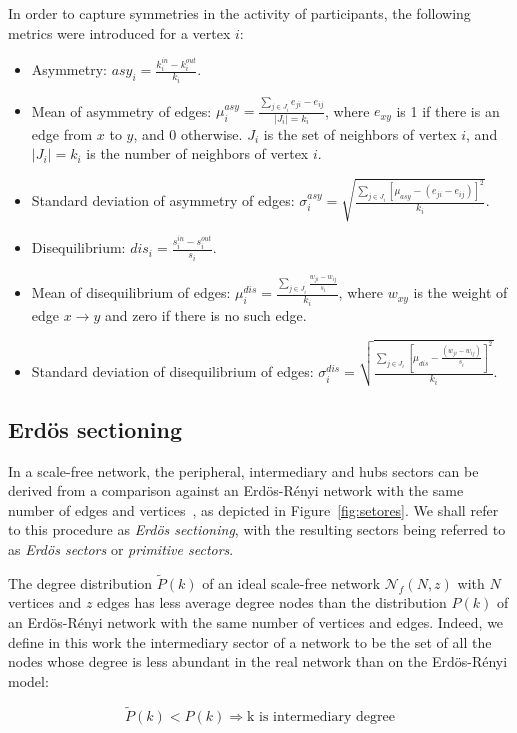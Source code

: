 \documentclass[%
	aip,
	jmp,%
	amsmath,amssymb,
	reprint,%
]{revtex4-1}
\begin{document}
In order to capture symmetries in the activity of participants, the following metrics were introduced for a vertex $i$: 

\begin{itemize}
	\item Asymmetry: $asy_i=\frac{k_i^{in}-k_i^{out}}{k_i}$.
	\item Mean of asymmetry of edges: $\mu_i^{asy}=\frac{\sum_{j\in J_i} e_{ji}-e_{ij}}{|J_i|=k_i}$, where $e_{xy}$ is 1 if there is an edge from $x$ to $y$, and $0$ otherwise. $J_i$ is the set of neighbors of vertex $i$, and $|J_i|=k_i$ is the number of neighbors of vertex $i$.
	\item Standard deviation of asymmetry of edges: $\sigma_i^{asy}=\sqrt{\frac{\sum_{j\in J_i}[\mu_{asy} -(e_{ji}-e_{ij}) ]^2  }{k_i}  }$.
	\item Disequilibrium: $dis_i=\frac{s_i^{in}-s_i^{out}}{s_i}$.
	\item Mean of disequilibrium of edges: $\mu_i^{dis}=\frac{\sum_{j \in J_i}\frac{w_{ji}-w_{ij}}{s_i}}{k_i}$, where $w_{xy}$ is the weight of edge $x\rightarrow y$ and zero if there is no such edge.
	\item Standard deviation of disequilibrium of edges: $\sigma_i^{dis}=\sqrt{\frac{\sum_{j\in J_i}[\mu_{dis}-\frac{(w_{ji}-w_{ij})}{s_i}]^2}{k_i}}$.
\end{itemize}

\subsection{Erd\"os sectioning}\label{sectioning}
In a scale-free network, the peripheral, intermediary and hubs sectors can be derived from a comparison against an Erd\"os-R\'enyi network with the same number of edges and vertices~\cite{3setores}, as depicted in Figure~\ref{fig:setores}. We shall refer to this procedure as \emph{Erd\"os sectioning}, with the resulting sectors being referred to as \emph{Erd\"os sectors} or \emph{primitive sectors}.

The degree distribution $\widetilde{P}(k)$ of an ideal
scale-free network $\mathcal{N}_f(N,z)$ with $N$ vertices and $z$ edges has less
average degree nodes than the distribution $P(k)$ of an Erd\"os-R\'enyi
network with the same number of vertices and edges. Indeed, we define in this work the intermediary sector of a network to be the set of all the nodes whose degree is less abundant in the real network than on the Erd\"os-R\'enyi model:

\begin{equation}\label{criterio}
	\widetilde{P}(k)<P(k) \Rightarrow \text{k is intermediary degree}
\end{equation}
\end{document}
